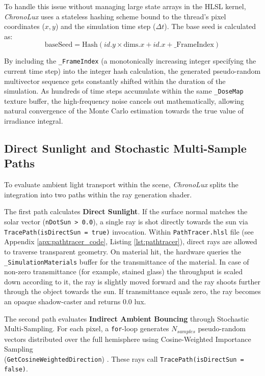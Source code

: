 To handle this issue without managing large state arrays in the HLSL kernel, \textit{ChronoLux} uses a stateless hashing scheme bound to the thread’s pixel coordinates ($x, y$) and the simulation time step ($\Delta t$). The base seed is calculated as:
\begin{equation}
    \text{baseSeed} = \text{Hash}(id.y \times \text{dims}.x + id.x + \text{\_FrameIndex})
\end{equation}

By including the \texttt{\_FrameIndex} (a monotonically increasing integer specifying the current time step) into the integer hash calculation, the generated pseudo-random multivector sequence gets constantly shifted within the duration of the simulation. As hundreds of time steps accumulate within the same \texttt{\_DoseMap} texture buffer, the high-frequency noise cancels out mathematically, allowing natural convergence of the Monte Carlo estimation towards the true value of irradiance integral.

\subsection{Direct Sunlight and Stochastic Multi-Sample Paths}

To evaluate ambient light transport within the scene, \textit{ChronoLux} splits the integration into two paths within the ray generation shader.

The first path calculates \textbf{Direct Sunlight}. If the surface normal matches the solar vector (\texttt{nDotSun > 0.0}), a single ray is shot directly towards the sun via \texttt{TracePath(isDirectSun = true)} invocation. Within \texttt{PathTracer.hlsl} file (see Appendix \ref{apx:pathtracer_code}, Listing \ref{lst:pathtracer}), direct rays are allowed to traverse transparent geometry. On material hit, the hardware queries the \texttt{\_SimulationMaterials} buffer for the transmittance of the material. In case of non-zero transmittance (for example, stained glass) the throughput is scaled down according to it, the ray is slightly moved forward and the ray shoots further through the object towards the sun. If transmittance equals zero, the ray becomes an opaque shadow-caster and returns $0.0$ lux.

The second path evaluates \textbf{Indirect Ambient Bouncing} through Stochastic Multi-Sampling. For each pixel, a \texttt{for}-loop generates $N_{samples}$ pseudo-random vectors distributed over the full hemisphere using Cosine-Weighted Importance Sampling \\ (\texttt{GetCosineWeightedDirection}) \cite{veach1995optimally}. These rays call \texttt{TracePath(isDirectSun = false)}.

